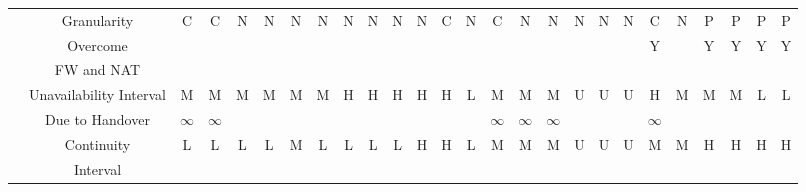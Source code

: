 \documentclass[preprint,12pt]{elsarticle}
\begin{document}
\begin{landscape}
\begin{table*}[t]
\begin{tabular}{|c|c|c|c|c|c|c|c|c|c|c|c|c|c|c|c|c|c|c|c|c|c|c|c|c|c|}
  \hhline{~-------------------------}
    & \multirow{2}{*}{Granularity} & \multirow{2}{*}{C} & 
	      \multirow{2}{*}{C} & \multirow{2}{*}{N} & \multirow{2}{*}{N} & \multirow{2}{*}{N} & \multirow{2}{*}{N} & \multirow{2}{*}{N} & \multirow{2}{*}{N} &  \multirow{2}{*}{N} & \multirow{2}{*}{N} & \multirow{2}{*}{C} & 
	      \multirow{2}{*}{N} & \multirow{2}{*}{C} & \multirow{2}{*}{N} & \multirow{2}{*}{N} &
	      \multirow{2}{*}{N} & \multirow{2}{*}{N} & \multirow{2}{*}{N} & \multirow{2}{*}{C} & 
	      \multirow{2}{*}{N} & \multirow{2}{*}{P} & \multirow{2}{*}{P} & \multirow{2}{*}{P} & 
	      \multirow{2}{*}{P} \\
    & & & & & & & & & & & & & & & & & & & & & & & & &\\
  \hhline{~-------------------------}
    & Overcome & & & & & &   & & & & & & & 
	       & &  &  & & & \multirow{2}{*}{Y} & & \multirow{2}{*}{Y} & \multirow{2}{*}{Y} & 
	      \multirow{2}{*}{Y} & \multirow{2}{*}{Y} \\
    & FW and NAT & & & & &  & & & & & & & & & & & & & & & & & & &\\
  \hhline{~-------------------------}
    & Unavailability Interval &  M & M & \multirow{2}{*}{M} &
	      \multirow{2}{*}{M} & \multirow{2}{*}{M} & \multirow{2}{*}{M} & 
	      \multirow{2}{*}{H} & \multirow{2}{*}{H} & \multirow{2}{*}{H} & 
	      \multirow{2}{*}{H} &  \multirow{2}{*}{H} & \multirow{2}{*}{L} & 
M & M & M & \multirow{2}{*}{U} & \multirow{2}{*}{U} & \multirow{2}{*}{U} 
	      & H & \multirow{2}{*}{M} & \multirow{2}{*}{M} & \multirow{2}{*}{M} & 
	      \multirow{2}{*}{L} & \multirow{2}{*}{L} \\
    & Due to Handover & $\infty$ &  $\infty$ &  & & & & & & & & & & 
	      $\infty$ & $\infty$ & $\infty$ & & & & $\infty$ & & & & & \\
  \hhline{~-------------------------}
    & Continuity & \multirow{2}{*}{L} & \multirow{2}{*}{L} & \multirow{2}{*}{L} & 
	      \multirow{2}{*}{L} & \multirow{2}{*}{M} & \multirow{2}{*}{L} & 
	      \multirow{2}{*}{L} & \multirow{2}{*}{L} & \multirow{2}{*}{L} & 
	      \multirow{2}{*}{H} &  \multirow{2}{*}{H} 
	      & \multirow{2}{*}{L} & 
	      \multirow{2}{*}{M} & \multirow{2}{*}{M} & \multirow{2}{*}{M} & 
\multirow{2}{*}{U} & \multirow{2}{*}{U} & \multirow{2}{*}{U} & 
	      \multirow{2}{*}{M} & \multirow{2}{*}{M} & \multirow{2}{*}{H} & 
	      \multirow{2}{*}{H} & \multirow{2}{*}{H} & \multirow{2}{*}{H} \\
    & Interval & & & & & & & & &  & & & & & & & & & & & & & & &\\

\end{tabular}
\end{table*}
\end{landscape}
\end{document}
